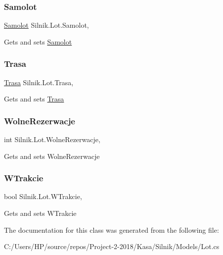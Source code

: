 \subsubsection{\texorpdfstring{Samolot}{Samolot}}
{\footnotesize\ttfamily \mbox{\hyperlink{class_silnik_1_1_samolot}{Samolot}} Silnik.\+Lot.\+Samolot\hspace{0.3cm}{\ttfamily [get]}, {\ttfamily [set]}}



Gets and sets \mbox{\hyperlink{class_silnik_1_1_samolot}{Samolot}} 

\mbox{\label{class_silnik_1_1_lot_a665ef105afa7a29ee7870c720b762d6e}} 
\subsubsection{\texorpdfstring{Trasa}{Trasa}}
{\footnotesize\ttfamily \mbox{\hyperlink{class_silnik_1_1_trasa}{Trasa}} Silnik.\+Lot.\+Trasa\hspace{0.3cm}{\ttfamily [get]}, {\ttfamily [set]}}



Gets and sets \mbox{\hyperlink{class_silnik_1_1_trasa}{Trasa}} 

\mbox{\label{class_silnik_1_1_lot_af5d78c458695021ff86158728209c31b}} 
\subsubsection{\texorpdfstring{Wolne\+Rezerwacje}{WolneRezerwacje}}
{\footnotesize\ttfamily int Silnik.\+Lot.\+Wolne\+Rezerwacje\hspace{0.3cm}{\ttfamily [get]}, {\ttfamily [set]}}



Gets and sets Wolne\+Rezerwacje 

\mbox{\label{class_silnik_1_1_lot_a8246b195b85797bb116d4b1ac61c8082}} 
\subsubsection{\texorpdfstring{W\+Trakcie}{WTrakcie}}
{\footnotesize\ttfamily bool Silnik.\+Lot.\+W\+Trakcie\hspace{0.3cm}{\ttfamily [get]}, {\ttfamily [set]}}



Gets and sets W\+Trakcie 



The documentation for this class was generated from the following file\+:\begin{DoxyCompactItemize}
\item 
C\+:/\+Users/\+H\+P/source/repos/\+Project-\/2-\/2018/\+Kasa/\+Silnik/\+Models/Lot.\+cs\end{DoxyCompactItemize}
